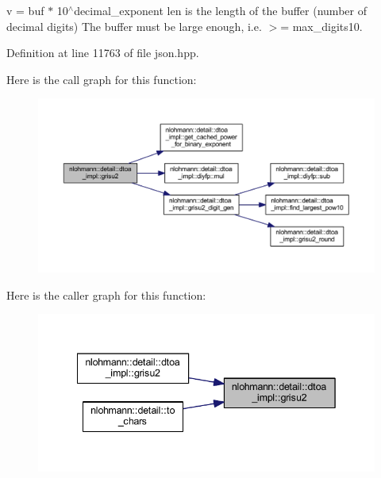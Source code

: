 v = buf $\ast$ 10$^\wedge$decimal\+\_\+exponent len is the length of the buffer (number of decimal digits) The buffer must be large enough, i.\+e. $>$= max\+\_\+digits10. 

Definition at line 11763 of file json.\+hpp.

Here is the call graph for this function\+:
\nopagebreak
\begin{figure}[H]
\begin{center}
\leavevmode
\includegraphics[width=350pt]{namespacenlohmann_1_1detail_1_1dtoa__impl_a05b681dcb8569b9784c6dccfadb01633_cgraph}
\end{center}
\end{figure}
Here is the caller graph for this function\+:
\nopagebreak
\begin{figure}[H]
\begin{center}
\leavevmode
\includegraphics[width=342pt]{namespacenlohmann_1_1detail_1_1dtoa__impl_a05b681dcb8569b9784c6dccfadb01633_icgraph}
\end{center}
\end{figure}
\mbox{\label{namespacenlohmann_1_1detail_1_1dtoa__impl_aab7a9670a4f4704a5d0347ad7588576b}} 
